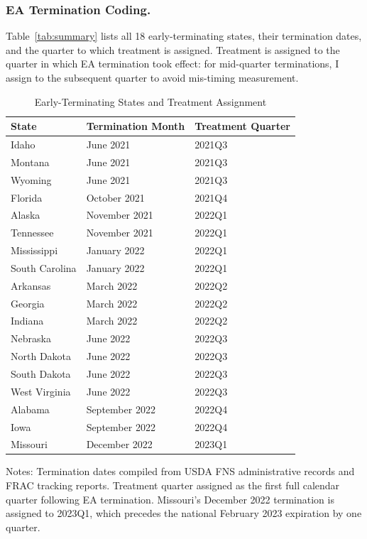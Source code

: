 \documentclass[12pt]{article}
\begin{document}
\subsubsection*{EA Termination Coding.} Table~\ref{tab:summary} lists all 18 early-terminating states, their termination dates, and the quarter to which treatment is assigned. Treatment is assigned to the quarter in which EA termination took effect: for mid-quarter terminations, I assign to the subsequent quarter to avoid mis-timing measurement.

\begin{table}[H]
\centering
\caption{Early-Terminating States and Treatment Assignment}
\label{tab:treated_states}
\begin{threeparttable}
\begin{tabular}{lll}
\toprule
State & Termination Month & Treatment Quarter \\
\midrule
Idaho & June 2021 & 2021Q3 \\
Montana & June 2021 & 2021Q3 \\
Wyoming & June 2021 & 2021Q3 \\
Florida & October 2021 & 2021Q4 \\
Alaska & November 2021 & 2022Q1 \\
Tennessee & November 2021 & 2022Q1 \\
Mississippi & January 2022 & 2022Q1 \\
South Carolina & January 2022 & 2022Q1 \\
Arkansas & March 2022 & 2022Q2 \\
Georgia & March 2022 & 2022Q2 \\
Indiana & March 2022 & 2022Q2 \\
Nebraska & June 2022 & 2022Q3 \\
North Dakota & June 2022 & 2022Q3 \\
South Dakota & June 2022 & 2022Q3 \\
West Virginia & June 2022 & 2022Q3 \\
Alabama & September 2022 & 2022Q4 \\
Iowa & September 2022 & 2022Q4 \\
Missouri & December 2022 & 2023Q1 \\
\bottomrule
\end{tabular}
\begin{tablenotes}[flushleft]
\small
\item Notes: Termination dates compiled from USDA FNS administrative records and FRAC tracking reports. Treatment quarter assigned as the first full calendar quarter following EA termination. Missouri's December 2022 termination is assigned to 2023Q1, which precedes the national February 2023 expiration by one quarter.
\end{tablenotes}
\end{threeparttable}
\end{table}
\end{document}

